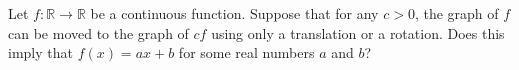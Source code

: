 Let $ f : \mathbb{R}\to \mathbb{R}$ be a continuous function. Suppose that for any $ c > 0$, the graph of $ f$ can be moved to the graph of $ cf$ using only a translation or a rotation. Does this imply that $ f(x) = ax+b$ for some real numbers $ a$ and $ b$?